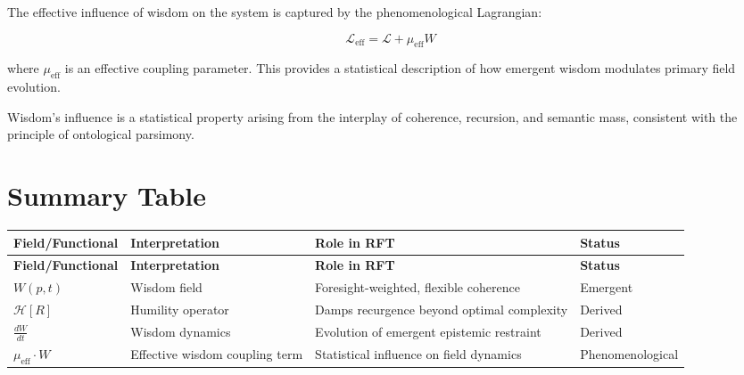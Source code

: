 The effective influence of wisdom on the system is captured by the phenomenological Lagrangian:

\begin{equation}
\mathcal{L}_{\text{eff}} = \mathcal{L} + \mu_{\text{eff}} W
\end{equation}

where \(\mu_{\text{eff}}\) is an effective coupling parameter. This provides a statistical description of how emergent wisdom modulates primary field evolution.

Wisdom's influence is a statistical property arising from the interplay of coherence, recursion, and semantic mass, consistent with the principle of ontological parsimony.

\section{Summary Table}

{\footnotesize
\begin{longtable}{|p{2.5cm}|p{4cm}|p{4.5cm}|p{2.5cm}|}
\hline
\textbf{Field/Functional} & \textbf{Interpretation} & \textbf{Role in RFT} & \textbf{Status} \\
\hline
\endfirsthead
\hline
\textbf{Field/Functional} & \textbf{Interpretation} & \textbf{Role in RFT} & \textbf{Status} \\
\hline
\endhead
\(W(p, t)\) & Wisdom field & Foresight-weighted, flexible coherence & Emergent \\
\hline
\(\mathcal{H}[R]\) & Humility operator & Damps recurgence beyond optimal complexity & Derived \\
\hline
\(\frac{dW}{dt}\) & Wisdom dynamics & Evolution of emergent epistemic restraint & Derived \\
\hline
\(\mu_{\text{eff}} \cdot W\) & Effective wisdom coupling term & Statistical influence on field dynamics & Phenomenological \\
\hline
\end{longtable}
} 